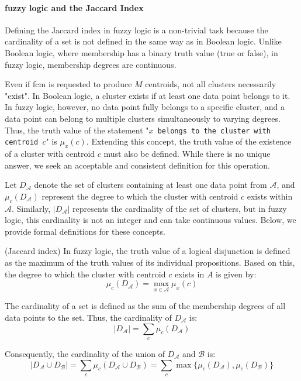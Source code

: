 \paragraph{fuzzy logic and the Jaccard Index}
\begin{toReview}
\noindent Defining the Jaccard index in fuzzy logic is a non-trivial task because the cardinality of a set is not defined in the same way as in Boolean logic. Unlike Boolean logic, where membership has a binary truth value (true or false), in fuzzy logic, membership degrees are continuous.

\noindent Even if \gls{fcm} is requested to produce $M$ centroids, not all clusters necessarily "exist". In Boolean logic, a cluster exists if at least one data point belongs to it. In fuzzy logic, however, no data point fully belongs to a specific cluster, and a data point can belong to multiple clusters simultaneously to varying degrees. Thus, the truth value of the statement "\texttt{$x$ belongs to the cluster with centroid $c$}" is $\mu_x(c)$. Extending this concept, the truth value of the existence of a cluster with centroid $c$ must also be defined. While there is no unique answer, we seek an acceptable and consistent definition for this operation.

\noindent Let $D_\mathcal{A}$ denote the set of clusters containing at least one data point from $\mathcal{A}$, and $\mu_c(D_\mathcal{A})$ represent the degree to which the cluster with centroid $c$ exists within $\mathcal{A}$. Similarly, $\left|D_\mathcal{A}\right|$ represents the cardinality of the set of clusters, but in fuzzy logic, this cardinality is not an integer and can take continuous values. Below, we provide formal definitions for these concepts.

\begin{definition}(Jaccard index)
	\label{def:Jaccard_fcm}
	In fuzzy logic, the truth value of a logical disjunction is defined as the maximum of the truth values of its individual propositions. Based on this, the degree to which the cluster with centroid $c$ exists in $A$ is given by:
	$$\mu_c(D_\mathcal{A}) = \max_{x\in\mathcal{A}}\mu_x(c)$$

	\noindent The cardinality of a set is defined as the sum of the membership degrees of all data points to the set. Thus, the cardinality of $D_\mathcal{A}$ is:
	$$|D_\mathcal{A}| = \sum_c \mu_c(D_\mathcal{A})$$

	\noindent Consequently, the cardinality of the union of $D_\mathcal{A}$ and $\mathcal{B}$ is:
	$$|D_\mathcal{A} \cup D_\mathcal{B}| = \sum_c \mu_c(D_\mathcal{A} \cup D_\mathcal{B}) = \sum_c \max\{\mu_c(D_\mathcal{A}), \mu_c(D_\mathcal{B})\} $$


\end{definition}
\end{toReview}
